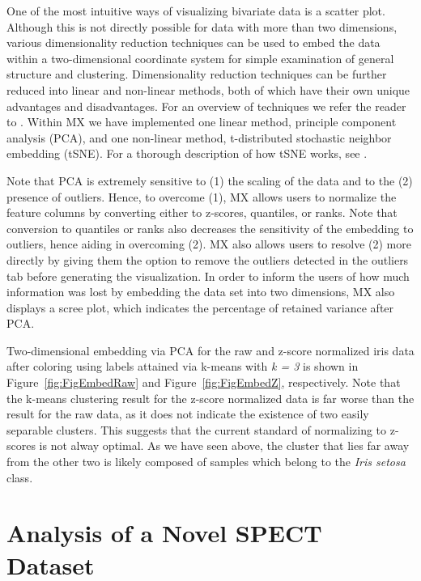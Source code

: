 \documentclass[review]{siamart0516}
\begin{document}
One of the most intuitive ways of visualizing bivariate data is a scatter plot. Although this is not directly possible for data with more than two dimensions, various dimensionality reduction techniques can be used to embed the data within a two-dimensional coordinate system for simple examination of general structure and clustering. Dimensionality reduction techniques can be further reduced into linear and non-linear methods, both of which have their own unique advantages and disadvantages. For an overview of techniques we refer the reader to \cite{van2009dimensionality}. Within MX we have implemented one linear method, principle component analysis (PCA), and one non-linear method, t-distributed stochastic neighbor embedding (tSNE). For a thorough description of how tSNE works, see \cite{van2008visualizing}.

Note that PCA is extremely sensitive to (1) the scaling of the data and to the (2) presence of outliers.  Hence, to overcome (1), MX allows users to normalize the feature columns by converting either to z-scores, quantiles, or ranks. Note that conversion to quantiles or ranks also decreases the sensitivity of the embedding to outliers, hence aiding in overcoming (2). MX also allows users to resolve (2) more directly by giving them the option to remove the outliers detected in the outliers tab before generating the visualization. In order to inform the users of how much information was lost by embedding the data set into two dimensions, MX also displays a scree plot, which indicates the percentage of retained variance after PCA. 

Two-dimensional embedding via PCA for the raw  and z-score normalized iris data after coloring using labels attained via k-means with \textit{k = 3} is shown in Figure~\ref{fig:FigEmbedRaw} and Figure~\ref{fig:FigEmbedZ}, respectively. Note that the k-means clustering result for the z-score normalized data is far worse than the result for the raw data, as it does not indicate the existence of two easily separable clusters. This suggests that the current standard of normalizing to z-scores is not alway optimal. As we have seen above, the cluster that lies far away from the other two is likely composed of samples which belong to the \textit{Iris setosa} class.

\section{Analysis of a Novel SPECT Dataset}
\end{document}
